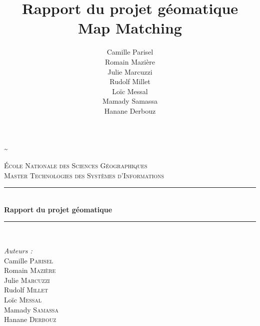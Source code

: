 \documentclass[10pt,a4paper]{report} %
\title{Rapport du projet géomatique \\ Map Matching}
\author{Camille Parisel \\ Romain Mazière \\ Julie Marcuzzi \\ Rudolf Millet \\ Loïc Messal \\ Mamady Samassa \\ Hanane Derbouz}
\begin{document}
\begin{titlepage}
		
	\~ 
	\newline
	\\[2cm]
	\newcommand{\HRule}{\rule{\linewidth}{0.5mm}} %
		
	\center %
		
		
	\textsc{\LARGE \'Ecole Nationale des Sciences Géographiques}\\[0.5cm] %
	\textsc{\Large Master Technologies des Systèmes d'Informations}\\[0.5cm] %
		
	\HRule \\[0.4cm]
	{ \huge \bfseries Rapport du projet géomatique}\\[0.4cm] %
	\HRule \\[1.5cm]
	\vfill
		
	\begin{minipage}[t]{0.4\textwidth}
		\begin{flushleft} \large
			\emph{Auteurs : } \newline \\
			Camille \textsc{Parisel} \\ 
			Romain \textsc{Mazière} \\ 
			Julie \textsc{Marcuzzi} \\ 
			Rudolf \textsc{Millet} \\ 
			Loïc \textsc{Messal} \\ 
			Mamady \textsc{Samassa} \\ 
			Hanane \textsc{Derbouz}
						

\end{flushleft}
\end{minipage}
\end{titlepage}
\end{document}
